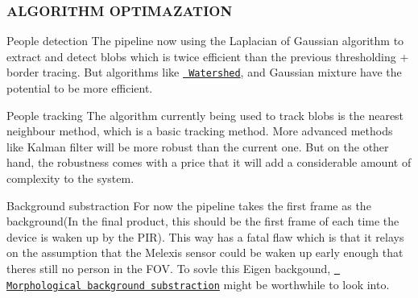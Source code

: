 \subsubsection*{A\+L\+G\+O\+R\+I\+T\+HM O\+P\+T\+I\+M\+A\+Z\+A\+T\+I\+ON}


\begin{DoxyEnumerate}
\item People detection The pipeline now using the Laplacian of Gaussian algorithm to extract and detect blobs which is twice efficient than the previous thresholding + border tracing. But algorithms like \href{./docs/watershed.pdf}{\texttt{ Watershed}}, and Gaussian mixture have the potential to be more efficient.
\item People tracking The algorithm currently being used to track blobs is the nearest neighbour method, which is a basic tracking method. More advanced methods like Kalman filter will be more robust than the current one. But on the other hand, the robustness comes with a price that it will add a considerable amount of complexity to the system.
\item Background substraction For now the pipeline takes the first frame as the background(\+In the final product, this should be the first frame of each time the device is waken up by the P\+I\+R). This way has a fatal flaw which is that it relays on the assumption that the Melexis sensor could be waken up early enough that there\textquotesingle{}s still no person in the F\+OV. To sovle this Eigen backgound, \href{./docs/people_detection.pdf}{\texttt{ Morphological background substraction}} might be worthwhile to look into. 
\end{DoxyEnumerate}